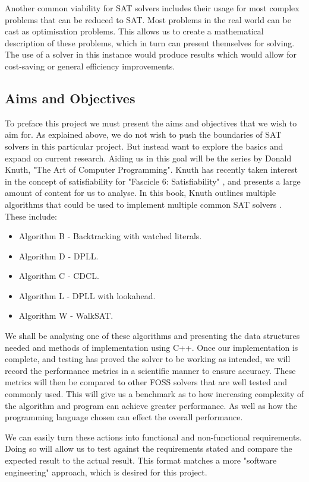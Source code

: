 \documentclass{article}
\begin{document}
Another common viability for SAT solvers includes their usage for most complex problems that can be reduced to SAT. Most problems
in the real world can be cast as optimisation problems. This allows us to create a mathematical description of these problems,
which in turn can present themselves for solving. The use of a solver in this instance would produce results which would allow
for cost-saving or general efficiency improvements.

\subsection{Aims and Objectives}
To preface this project we must present the aims and objectives that we wish to aim for. As explained above, we do not wish to
push the boundaries of SAT solvers in this particular project. But instead want to explore the basics and expand on current
research. Aiding us in this goal will be the series by Donald Knuth, "The Art of Computer Programming". Knuth has recently taken
interest in the concept of satisfiability for "Fascicle 6: Satisfiability" , and presents a large amount of content for us to
analyse. In this book, Knuth outlines multiple algorithms that could be used to implement multiple common SAT solvers\cite{donald}
. These include:

\begin{itemize}
    \item Algorithm B - Backtracking with watched literals.
    \item Algorithm D - DPLL.
    \item Algorithm C - CDCL.
    \item Algorithm L - DPLL with lookahead.
    \item Algorithm W - WalkSAT.
\end{itemize}

We shall be analysing one of these algorithms and presenting the data structures needed and methods of implementation using C++.
Once our implementation is complete, and testing has proved the solver to be working as intended, we will record the performance
metrics in a scientific manner to ensure accuracy. These metrics will then be compared to other FOSS solvers that are well tested
and commonly used. This will give us a benchmark as to how increasing complexity of the algorithm and program can achieve greater
performance. As well as how the programming language chosen can effect the overall performance.

We can easily turn these actions into functional and non-functional requirements. Doing so will allow us to test against the
requirements stated and compare the expected result to the actual result. This format matches a more "software engineering"
approach, which is desired for this project.
\end{document}
